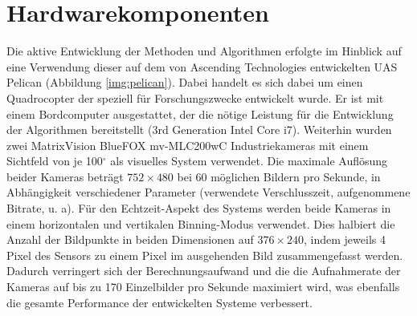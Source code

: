 \section{Hardwarekomponenten}
\label{sec:setup}

Die aktive Entwicklung der Methoden und Algorithmen erfolgte im Hinblick auf eine Verwendung dieser auf dem von Ascending Technologies \cite{asctec} entwickelten UAS Pelican (Abbildung \ref{img:pelican}). Dabei handelt es sich dabei um einen Quadrocopter der speziell für Forschungszwecke entwickelt wurde. Er ist mit einem Bordcomputer ausgestattet, der die nötige Leistung für die Entwicklung der Algorithmen bereitstellt (3rd Generation Intel Core i7). Weiterhin wurden zwei MatrixVision BlueFOX mv-MLC200wC Industriekameras \cite{matrixvision} mit einem Sichtfeld von je 100$^\circ$ als visuelles System verwendet. Die maximale Auflösung beider Kameras beträgt $752\times480$ bei 60 möglichen Bildern pro Sekunde, in Abhängigkeit verschiedener Parameter (verwendete Verschlusszeit, aufgenommene Bitrate, u. a). Für den Echtzeit-Aspekt des Systems werden beide Kameras in einem horizontalen und vertikalen Binning-Modus verwendet. Dies halbiert die Anzahl der Bildpunkte in beiden Dimensionen auf $376\times240$, indem jeweils 4 Pixel des Sensors zu einem Pixel im ausgehenden Bild zusammengefasst werden. Dadurch verringert sich der Berechnungsaufwand und die die Aufnahmerate der Kameras auf bis zu 170 Einzelbilder pro Sekunde maximiert wird, was ebenfalls die gesamte Performance der entwickelten Systeme verbessert.

